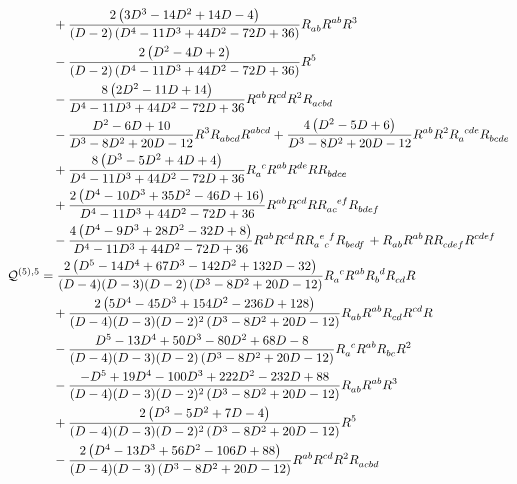 \documentclass[a4paper,11pt]{article}
\begin{document}
\begin{subequations}
\begin{align}
        & \quad +\frac{2 \left(3 D^3-14 D^2+14 D-4\right)}{(D-2) \left(D^4-11 D^3+44 D^2-72 D+36\right)}R\indices{_a_b}R\indices{^a^b}R^3\nonumber\\
        & \quad -\frac{2 \left(D^2-4 D+2\right)}{(D-2) \left(D^4-11 D^3+44 D^2-72 D+36\right)}R^5\nonumber\\
        & \quad -\frac{8 \left(2 D^2-11 D+14\right)}{D^4-11 D^3+44 D^2-72 D+36}R\indices{^a^b}R\indices{^c^d}R^2R\indices{_a_c_b_d}\nonumber\\
        & \quad -\frac{D^2-6 D+10}{D^3-8 D^2+20 D-12}R^3R\indices{_a_b_c_d}R\indices{^a^b^c^d}+\frac{4 \left(D^2-5 D+6\right)}{D^3-8 D^2+20 D-12}R\indices{^a^b}R^2R\indices{_a^c^d^e}R\indices{_b_c_d_e}\nonumber\\
        & \quad +\frac{8 \left(D^3-5 D^2+4 D+4\right)}{D^4-11 D^3+44 D^2-72 D+36}R\indices{_a^c}R\indices{^a^b}R\indices{^d^e}RR\indices{_b_d_c_e}\nonumber\\
        & \quad +\frac{2 \left(D^4-10 D^3+35 D^2-46 D+16\right)}{D^4-11 D^3+44 D^2-72 D+36}R\indices{^a^b}R\indices{^c^d}RR\indices{_a_c^e^f}R\indices{_b_d_e_f}\nonumber\\
        & \quad -\frac{4 \left(D^4-9 D^3+28 D^2-32 D+8\right)}{D^4-11 D^3+44 D^2-72 D+36}R\indices{^a^b}R\indices{^c^d}RR\indices{_a^e_c^f}R\indices{_b_e_d_f}+R\indices{_a_b}R\indices{^a^b}RR\indices{_c_d_e_f}R\indices{^c^d^e^f}\label{eq:quintic-qtg-4}\\
        \mathcal Q^{(5), 5} & = \frac{2 \left(D^5-14 D^4+67 D^3-142 D^2+132 D-32\right)}{(D-4) (D-3) (D-2) \left(D^3-8 D^2+20 D-12\right)}R\indices{_a^c}R\indices{^a^b}R\indices{_b^d}R\indices{_c_d}R\nonumber\\
        &\quad +\frac{2 \left(5 D^4-45 D^3+154 D^2-236 D+128\right)}{(D-4) (D-3) (D-2)^2 \left(D^3-8 D^2+20 D-12\right)}R\indices{_a_b}R\indices{^a^b}R\indices{_c_d}R\indices{^c^d}R\nonumber\\
        &\quad -\frac{D^5-13 D^4+50 D^3-80 D^2+68 D-8}{(D-4) (D-3) (D-2) \left(D^3-8 D^2+20 D-12\right)}R\indices{_a^c}R\indices{^a^b}R\indices{_b_c}R^2\nonumber\\
        &\quad -\frac{-D^5+19 D^4-100 D^3+222 D^2-232 D+88}{(D-4) (D-3) (D-2)^2 \left(D^3-8 D^2+20 D-12\right)}R\indices{_a_b}R\indices{^a^b}R^3\nonumber\\
        &\quad +\frac{2 \left(D^3-5 D^2+7 D-4\right)}{(D-4) (D-3) (D-2)^2 \left(D^3-8 D^2+20 D-12\right)}R^5\nonumber\\
        &\quad -\frac{2 \left(D^4-13 D^3+56 D^2-106 D+88\right)}{(D-4) (D-3) \left(D^3-8 D^2+20 D-12\right)}R\indices{^a^b}R\indices{^c^d}R^2R\indices{_a_c_b_d}\nonumber\\

\end{align}
\end{subequations}
\end{document}

